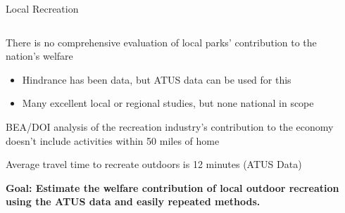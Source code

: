 \documentclass[notes,11pt, aspectratio=169]{beamer}
\newenvironment{wideitemize}{\itemize\addtolength{\itemsep}{10pt}}{\enditemize}
\begin{document}

\begin{frame}{Local Recreation}

\begin{columns}[T] %
\begin{column}{.9\textwidth}
  \begin{wideitemize}
  \item There is no comprehensive evaluation of local parks' contribution to the nation's welfare 
      \begin{itemize}
          \item Hindrance has been data, but ATUS data can be used for this \citep{berry_allocation_2018} 
          \item Many excellent local or regional studies, but none national in scope 
      \end{itemize}
  \item BEA/DOI analysis of the recreation industry's contribution to the economy doesn't include activities within 50 miles of home 

  \item Average travel time to recreate outdoors is 12 minutes (ATUS Data) 
  \item \textbf{Goal: Estimate the welfare contribution of local outdoor recreation using the ATUS data and easily repeated methods. }

  \end{wideitemize}
\end{column}%
\hfill%
\begin{column}{.38\textwidth}
  \makebox[\linewidth][c]{
    \resizebox{\linewidth}{!}{
    }
  }
\end{column}%
\end{columns}
\end{frame}
\end{document}

